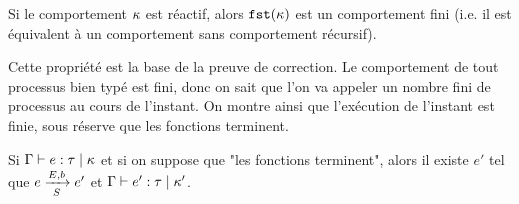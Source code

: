 \documentclass[9pt,preprint]{sigplanconf}
\begin{document}
\begin{property}
Si le comportement $\rk$ est réactif, alors $\rkfst{\rk}$ est un comportement fini (i.e. il est équivalent à un comportement sans comportement récursif).
\end{property}
Cette propriété est la base de la preuve de correction. Le comportement de tout processus bien typé est fini, donc on sait que l'on va appeler un nombre fini de processus au cours de l'instant. On montre ainsi que l'exécution de l'instant est finie, sous réserve que les fonctions terminent.

\begin{theorem}[Sureté]
Si $\tyju{\tyenv}{e}{\rt}{\rk}$ et si on suppose que "les fonctions terminent", alors il existe $e'$ tel que $\bigstep{N}{e}{e'} {E}{b}{S}$ et $\tyju{\tyenv}{e'}{\rt}{\rk'}$.
\end{theorem}
\end{document}
